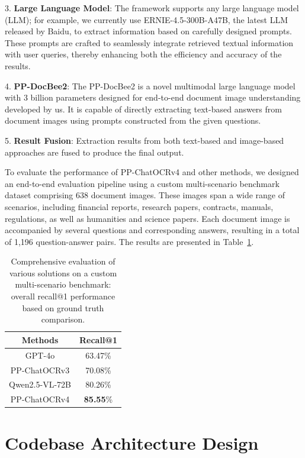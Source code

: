 \documentclass[11pt, a4paper, logo, copyright, nonumbering]{paddleocr}
\begin{document}
3. \textbf{Large Language Model}: The framework supports any large language model (LLM); for example, we currently use ERNIE-4.5-300B-A47B, the latest LLM released by Baidu, to extract information based on carefully designed prompts. These prompts are crafted to seamlessly integrate retrieved textual information with user queries, thereby enhancing both the efficiency and accuracy of the results.

4. \textbf{PP-DocBee2}: The PP-DocBee2 is a novel multimodal large language model with 3 billion parameters designed for end-to-end document image understanding developed by us. It is capable of directly extracting text-based answers from document images using prompts constructed from the given questions.

5. \textbf{Result Fusion}: Extraction results from both text-based and image-based approaches are fused to produce the final output.

To evaluate the performance of PP-ChatOCRv4 and other methods, we designed an end-to-end evaluation pipeline using a custom multi-scenario benchmark dataset comprising 638 document images. These images span a wide range of scenarios, including financial reports, research papers, contracts, manuals, regulations, as well as humanities and science papers. Each document image is accompanied by several questions and corresponding answers, resulting in a total of 1,196 question-answer pairs. The results are presented in Table~\ref{tab:pp-charocrv4-recall}.

\begin{table}[!h]
    \centering
    \begin{tabular}{c|c}
        \toprule
        Methods         &  Recall@1             \\
        \midrule
        GPT-4o          &  63.47\%              \\
        PP-ChatOCRv3    &  70.08\%              \\
        Qwen2.5-VL-72B  &  80.26\%              \\
        PP-ChatOCRv4    &  \textbf{85.55}\%     \\
        \bottomrule
    \end{tabular}
    \caption{Comprehensive evaluation of various solutions on a custom multi-scenario benchmark: overall recall@1 performance based on ground truth comparison.}
    \label{tab:pp-charocrv4-recall}
\end{table}


\section{Codebase Architecture Design}
\end{document}
